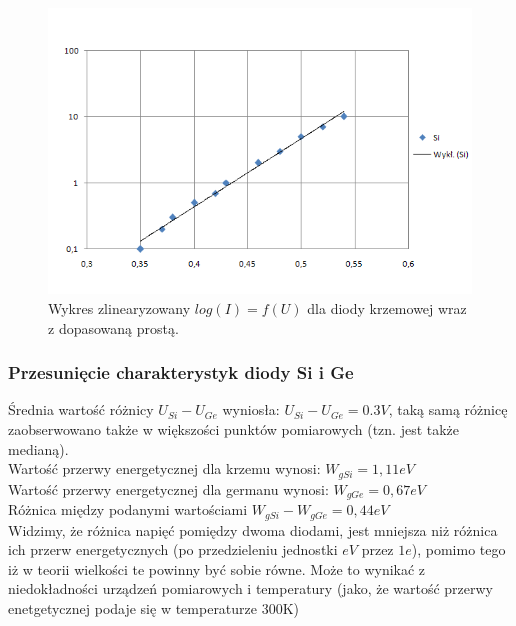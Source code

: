 \documentclass[11pt]{article}
\begin{document}
\begin{figure}[H]
    \centering
    \includegraphics[height=0.27\paperheight]{graph2}
    \caption{ Wykres  zlinearyzowany $ log(I) = f(U)$ dla diody krzemowej wraz z dopasowaną prostą. }
    \label{fig:graph3}
\end{figure}

\subsubsection{Przesunięcie charakterystyk diody Si i Ge}
Średnia wartość różnicy $U_{Si} - U_{Ge}$ wyniosła: $U_{Si} - U_{Ge} = 0.3V$, taką samą różnicę zaobserwowano także w większości punktów pomiarowych (tzn. jest także medianą).\\
\newline
Wartość przerwy energetycznej dla krzemu wynosi: $W_{gSi} = 1,11eV$\\
Wartość przerwy energetycznej dla germanu wynosi: $W_{gGe} = 0,67eV$\\
Różnica między podanymi wartościami $W_{gSi} - W_{gGe} = 0,44eV$\\
\newline
Widzimy, że różnica napięć pomiędzy dwoma diodami, jest mniejsza niż różnica ich przerw energetycznych (po przedzieleniu jednostki $eV$ przez $1e$), pomimo tego iż w teorii wielkości te powinny być sobie równe. Może to wynikać z niedokładności urządzeń pomiarowych i temperatury (jako, że wartość przerwy enetgetycznej podaje się w temperaturze 300K) 
\end{document}
